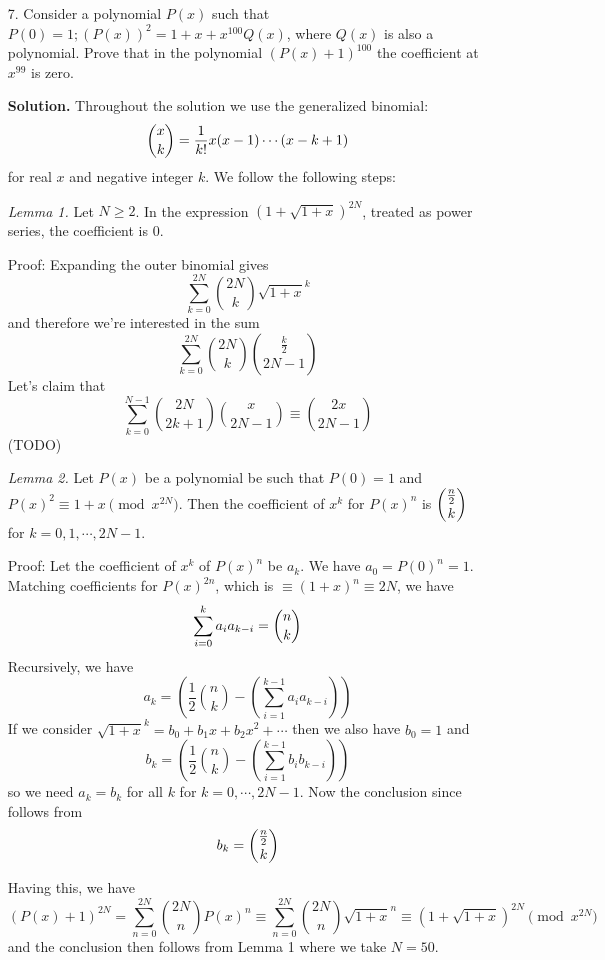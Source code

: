 \documentclass[11pt,a4paper]{article}
\begin{document}
\begin{enumerate}
	
	\item[7.] 
	Consider a polynomial $P(x)$ such that
	$P(0) = 1; (P(x))^2 = 1 + x + x^{100}Q(x)$, 
	where $Q(x)$ is also a polynomial.
	Prove that in the polynomial $(P(x) + 1)^{100}$ the coefficient at $x^{99}$ is zero.
	
	\textbf{Solution.} 
	Throughout the solution we use the generalized binomial: 
	\[
	\dbinom{x}{k} = \frac{1}{k!} x(x-1)\cdots (x-k+1)
	\]
	for real $x$ and negative integer $k$. 
	We follow the following steps: 
	
	\emph{Lemma 1.} 
	Let $N\ge 2$. 
	In the expression $(1+\sqrt{1+x})^{2N}$, treated as power series, 
	the coefficient is 0. 
	
	Proof: Expanding the outer binomial gives 
	\[
	\sum_{k=0}^{2N}\binom{2N}{k}\sqrt{1+x}^k
	\]
	and therefore we're interested in the sum 
	\[
	\sum_{k=0}^{2N}\binom{2N}{k}\binom{\frac k2}{2N-1}
	\]
	Let's claim that 
	\[
	\sum_{k=0}^{N-1}\binom{2N}{2k+1}\binom{x}{2N-1}
	\equiv \binom{2x}{2N-1}
	\]
	(TODO)
	
	\emph{Lemma 2.} 
	Let $P(x)$ be a polynomial be such that $P(0)=1$ and $P(x)^2 \equiv 1+x\pmod{x^{2N}}$. 
	Then the coefficient of $x^k$ for $P(x)^{n}$ is $\dbinom{\frac n2}{k}$ for $k=0, 1, \cdots, 2N-1$. 
	
	Proof: Let the coefficient of $x^k$ of $P(x)^{n}$ be $a_k$. We have $a_0=P(0)^n=1$. 
	Matching coefficients for $P(x)^{2n}$, which is $\equiv (1+x)^n\equiv{2N}$, we have 
	\[
	\sum_{i=0}^k a_{i}a_{k-i} = 
	\dbinom{n}{k}
	\]
	Recursively, we have 
	\[
	a_k = \left(\frac 12\binom{n}{k}-\left(\sum_{i=1}^{k-1}a_ia_{k-i}\right)\right)
	\]
	If we consider $\sqrt{1+x}^{k}=b_0+b_1x+b_2x^2+\cdots$ then we also have $b_0=1$ and 
	\[
	b_k = \left(\frac 12\binom{n}{k}-\left(\sum_{i=1}^{k-1}b_ib_{k-i}\right)\right)
	\]
	so we need $a_k=b_k$ for all $k$ for $k=0, \cdots, 2N-1$. 
	Now the conclusion since follows from 
	\[
	b_k=\dbinom{\frac n2}{k}
	\]
	
	Having this, we have 
	\[
	(P(x)+1)^{2N}
	=\sum_{n=0}^{2N}\binom{2N}{n}P(x)^n
	\equiv \sum_{n=0}^{2N}\binom{2N}{n}\sqrt{1+x}^n
	\equiv(1+\sqrt{1+x})^{2N}
	\pmod{x^{2N}}
	\]
	and the conclusion then follows from Lemma 1 where we take $N=50$. 
	
\end{enumerate}
\end{document}
